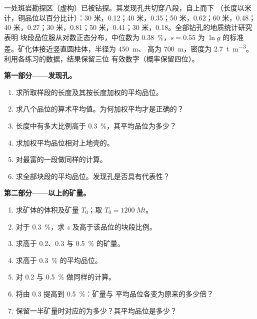 \begin{problem}\label{pb:b2:ore-deposits:1}
一处斑岩勘探区（虚构）已被钻探。其发现孔共切穿八段，自上而下
（长度以米计，铜品位以百分比计）：30 米，0.12；40 米，0.35；50 米，0.62；60
米，0.48；40 米，0.27；30 米，0.81；50 米，0.41；30 米，0.18。全部钻孔的地质统计研究表明
块段品位服从对数正态分布，中位数为 \qty{0.38}{\percent}，$s = 0.55$
为 $\ln g$ 的标准差。矿化体接近竖直圆柱体，半径为 \qty{450}{m}、
高为 \qty{700}{m}，密度为 \qty{2.7}{t.m^{-3}}。利用各练习的数据，结果保留三位
有效数字（概率保留四位）。

\noindent\textbf{第一部分——发现孔。}
\begin{enumerate}
  \item 求所取样段的长度及其按长度加权的平均品位。
  \item 求八个品位的算术平均值。为何加权平均才是正确的？
  \item 长度中有多大比例高于 \qty{0.3}{\percent}，其平均品位为多少？
  \item 求加权平均品位相对上地壳的。
  \item 对最富的一段做同样的计算。
  \item 求全部块段的平均品位。发现孔是否具有代表性？
\end{enumerate}

\noindent\textbf{第二部分——以上的矿量。}
\begin{enumerate}[resume]
  \item 求矿体的体积及矿量 $T_0$；取 $T_0 = \qty{1200}{Mt}$。
  \item 对于 \qty{0.3}{\percent}，求 $z$ 及高于该品位的块段比例。
  \item 求高于 0.2、0.3 与 \qty{0.5}{\percent} 的矿量。
  \item 求高于 \qty{0.3}{\percent} 的平均品位。
  \item 对 0.2 与 \qty{0.5}{\percent} 做同样的计算。
  \item 将由 0.3 提高到 \qty{0.5}{\percent}：矿量与
        平均品位各变为原来的多少倍？
  \item 保留一半矿量时对应的为多少？其平均品位是多少？
\end{enumerate}


\end{problem}
